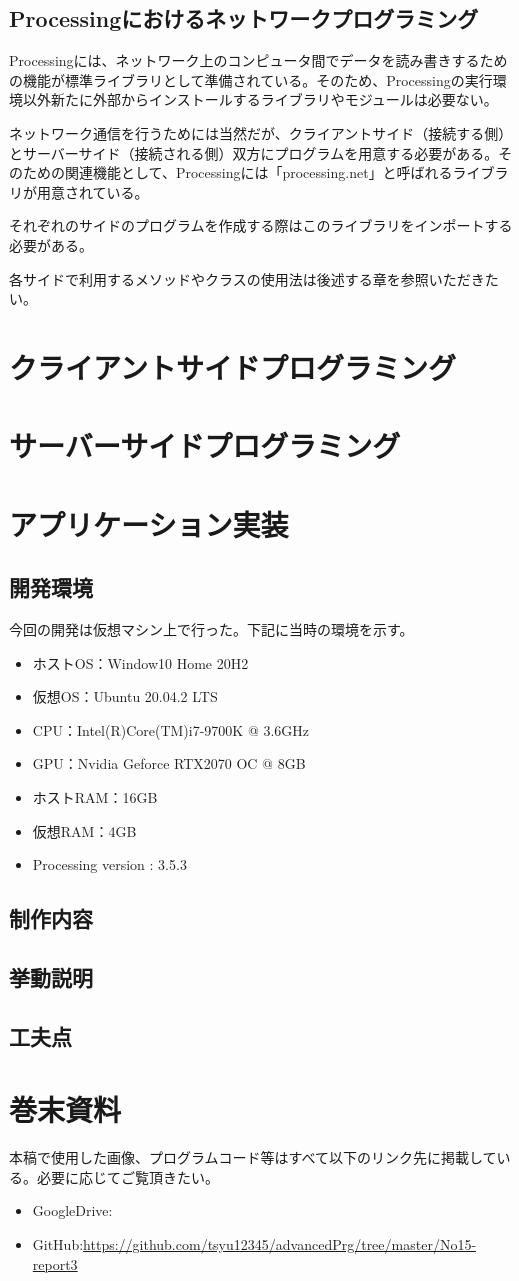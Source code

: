 \documentclass[dvipdfmx]{jsarticle}
\begin{document}
\subsection{Processingにおけるネットワークプログラミング}
Processingには、ネットワーク上のコンピュータ間でデータを読み書きするための機能が標準ライブラリとして準備されている。そのため、Processingの実行環境以外新たに外部からインストールするライブラリやモジュールは必要ない。\par
ネットワーク通信を行うためには当然だが、クライアントサイド（接続する側）とサーバーサイド（接続される側）双方にプログラムを用意する必要がある。そのための関連機能として、Processingには「processing.net」と呼ばれるライブラリが用意されている。\par
それぞれのサイドのプログラムを作成する際はこのライブラリをインポートする必要がある。\par
各サイドで利用するメソッドやクラスの使用法は後述する章を参照いただきたい。
\section{クライアントサイドプログラミング}
\section{サーバーサイドプログラミング}
\section{アプリケーション実装}
\subsection{開発環境}
今回の開発は仮想マシン上で行った。下記に当時の環境を示す。
\begin{itemize}
  \item ホストOS：Window10 Home 20H2
  \item 仮想OS：Ubuntu 20.04.2 LTS
  \item CPU：Intel(R)Core(TM)i7-9700K @ 3.6GHz
  \item GPU：Nvidia Geforce RTX2070 OC @ 8GB
  \item ホストRAM：16GB
  \item 仮想RAM：4GB
  \item Processing version : 3.5.3
\end{itemize}
\subsection{制作内容}
\subsection{挙動説明}
\subsection{工夫点}
\section{巻末資料}
本稿で使用した画像、プログラムコード等はすべて以下のリンク先に掲載している。必要に応じてご覧頂きたい。
\begin{itemize}
  \item GoogleDrive:\url{}
  \item GitHub:\url{https://github.com/tsyu12345/advancedPrg/tree/master/No15-report3}
\end{itemize}
\end{document}
